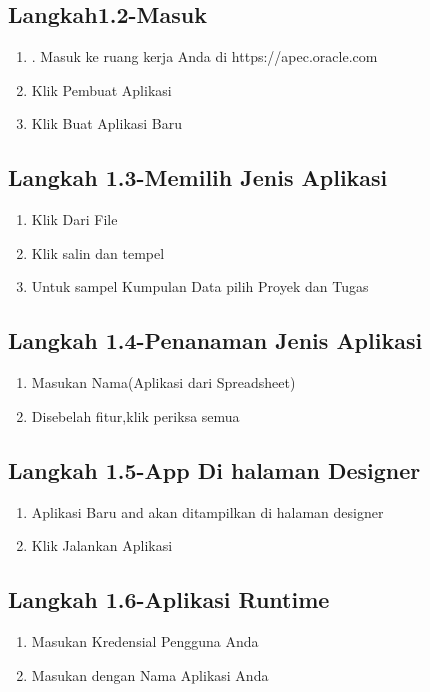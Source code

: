 \documentclass{article}
\begin{document}
\subsection{Langkah1.2-Masuk}
     \begin{enumerate}
         \item . Masuk ke ruang kerja Anda di https://apec.oracle.com
         \item  Klik Pembuat Aplikasi
         \item  Klik Buat Aplikasi Baru

     \end{enumerate}

\subsection{Langkah 1.3-Memilih Jenis Aplikasi}
      \begin{enumerate}
          \item  Klik Dari File
        \item Klik salin dan tempel
          \item Untuk sampel Kumpulan Data pilih
          Proyek dan Tugas
    \end{enumerate}
    
\subsection{Langkah 1.4-Penanaman Jenis Aplikasi}
      \begin{enumerate}
          \item Masukan Nama(Aplikasi dari Spreadsheet)
          \item Disebelah fitur,klik periksa semua
      \end{enumerate}
\subsection{Langkah 1.5-App Di halaman Designer}
    \begin{enumerate}
        \item Aplikasi Baru and akan ditampilkan di halaman designer
        \item Klik Jalankan Aplikasi
    \end{enumerate}
    
\subsection{Langkah 1.6-Aplikasi Runtime}
     \begin{enumerate}
         \item Masukan Kredensial Pengguna Anda
         \item Masukan dengan Nama Aplikasi Anda
     \end{enumerate}
\end{document}
